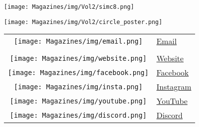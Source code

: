 \documentclass{article}
\begin{document}
\begin{multicols}{2}
\begin{center}
    \noindent\texttt{[image: Magazines/img/Vol2/simc8.png]}
\end{center}

\begin{center}
    \texttt{[image: Magazines/img/Vol2/circle\_poster.png]}
\end{center}
\clearcolumn
\;
{
\vspace{1.5cm}
\begin{center}
\begin{tabular}{c l}
  \texttt{[image: Magazines/img/email.png]}
    & \href{mailto:seattleinfinitymathcircle@gmail.com}{Email}\\
  \;\\
  \texttt{[image: Magazines/img/website.png]}
    & \href{https://seattleinfinity.org}{Website} \\
  \texttt{[image: Magazines/img/facebook.png]}
    & \href{https://www.facebook.com/simathcircle/}{Facebook} \\
  \texttt{[image: Magazines/img/insta.png]}
    & \href{https://www.instagram.com/seattleinfinitymathcircle/}{Instagram} \\
  \texttt{[image: Magazines/img/youtube.png]}
    & \href{https://www.youtube.com/channel/UCgwA-iysWPc_XG0R0AZ5z5g/videos}{YouTube} \\
  \texttt{[image: Magazines/img/discord.png]}
    & \href{https://discord.gg/2Ma3dURhTt}{Discord} 
\end{tabular}
\end{center} 
}
\end{multicols}
\end{document}
